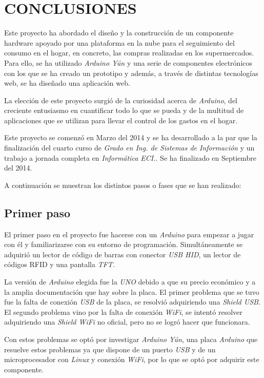 \chapter{CONCLUSIONES}

Este proyecto ha abordado el diseño y la construcción de un componente hardware apoyado por una plataforma en la nube para el seguimiento del consumo en el hogar, en concreto, las compras realizadas en los supermercados. Para ello, se ha utilizado \emph{Arduino Yún} y una serie de componentes electrónicos con los que se ha creado un prototipo y además, a través de distintas tecnologías web, se ha diseñado una aplicación web.

La elección de este proyecto surgió de la curiosidad acerca de \emph{Arduino}, del creciente entusiasmo en cuantificar todo lo que se pueda y de la multitud de aplicaciones que se utilizan para llevar el control de los gastos en el hogar.

Este proyecto se comenzó en Marzo del 2014 y se ha desarrollado a la par que la finalización del cuarto curso de \emph{Grado en Ing. de Sistemas de Información} y un trabajo a jornada completa en \emph{Informática ECI.}. Se ha finalizado en Septiembre del 2014.

A continuación se muestran los distintos pasos o fases que se han realizado:

\section{Primer paso}

El primer paso en el proyecto fue hacerse con un \emph{Arduino} para empezar a jugar con él y familiarizarse con su entorno de programación. Simultáneamente se adquirió un lector de código de barras con conector \emph{USB HID}, un lector de códigos RFID y una pantalla \emph{TFT}.

La versión de \emph{Arduino} elegida fue la \emph{UNO} debido a que su precio económico y a la amplia documentación que hay sobre la placa. El primer problema que se tuvo fue la falta de conexión \emph{USB} de la placa, se resolvió adquiriendo una \emph{Shield USB}. El segundo problema vino por la falta de conexión \emph{WiFi}, se intentó resolver adquiriendo una \emph{Shield WiFi} no oficial, pero no se logró hacer que funcionara.

Con estos problemas se optó por investigar \emph{Arduino Yún}, una placa \emph{Arduino} que resuelve estos problemas ya que dispone de un puerto \emph{USB} y de un microprocesador con \emph{Linux} y conexión \emph{WiFi}, por lo que se optó por adquirir este componente.

